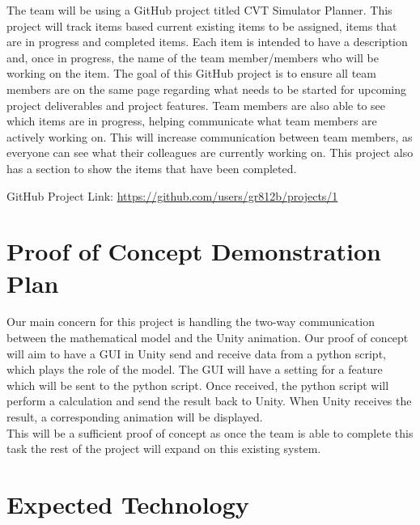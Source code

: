 \documentclass{article}
\begin{document}
The team will be using a GitHub project titled CVT Simulator Planner. 
This project will track items based current existing items to be assigned, items that are in progress and completed items. Each item is intended to have a description and, once in progress, the name of the team member/members who will be working on the item.
The goal of this GitHub project is to ensure all team members are on the same page regarding what needs to be started for upcoming project deliverables and project features. 
Team members are also able to see which items are in progress, helping communicate what team members are actively working on.
This will increase communication between team members, as everyone can see what their colleagues are currently working on.
This project also has a section to show the items that have been completed. 

\noindent GitHub Project Link: \url{https://github.com/users/gr812b/projects/1}

\section{Proof of Concept Demonstration Plan}

Our main concern for this project is handling the two-way communication between the mathematical model and the Unity animation.
Our proof of concept will aim to have a GUI in Unity send and receive data from a python script, which plays the role of the model.
The GUI will have a setting for a feature which will be sent to the python script. 
Once received, the python script will perform a calculation and send the result back to Unity.
When Unity receives the result, a corresponding animation will be displayed.
\\
\noindent
This will be a sufficient proof of concept as once the team is able to complete this task the rest of the project will expand on this existing system. 

\section{Expected Technology}
\end{document}
